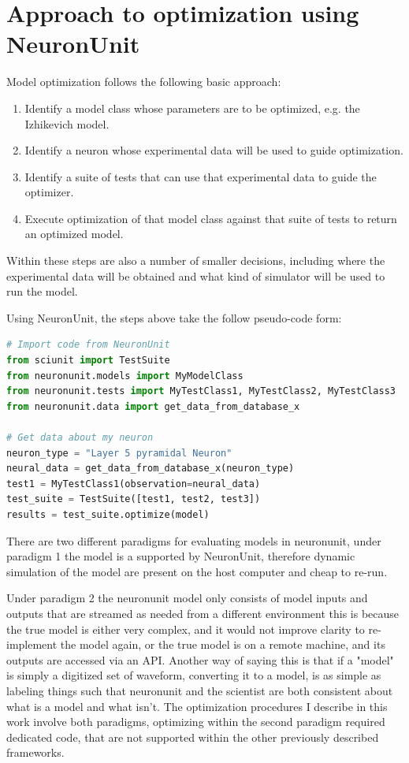 \section{Approach to optimization using NeuronUnit}
Model optimization follows the following basic approach:
\begin{enumerate}
	\item Identify a model class whose parameters are to be optimized, e.g. the Izhikevich model.
	\item Identify a neuron whose experimental data will be used to guide optimization.
	\item Identify a suite of tests that can use that experimental data to guide the optimizer.
	\item Execute optimization of that model class against that suite of tests to return an optimized model.
\end{enumerate}
Within these steps are also a number of smaller decisions, including where the experimental data will be obtained and what kind of simulator will be used to run the model.

Using NeuronUnit, the steps above take the follow pseudo-code form:

\begin{lstlisting}[language=python]
# Import code from NeuronUnit
from sciunit import TestSuite
from neuronunit.models import MyModelClass
from neuronunit.tests import MyTestClass1, MyTestClass2, MyTestClass3
from neuronunit.data import get_data_from_database_x

# Get data about my neuron
neuron_type = "Layer 5 pyramidal Neuron"
neural_data = get_data_from_database_x(neuron_type)
test1 = MyTestClass1(observation=neural_data)
test_suite = TestSuite([test1, test2, test3])
results = test_suite.optimize(model)
\end{lstlisting}

There are two different paradigms for evaluating models in neuronunit, under paradigm 1 the model is a supported by NeuronUnit, therefore dynamic simulation of the model are present on the host computer and cheap to re-run.

Under paradigm 2 the neuronunit model only consists of model inputs and outputs that are streamed as needed from a different environment this is because the true model is either very complex, and it would not improve clarity to re-implement the model again, or the true model is on a remote machine, and its outputs are accessed via an API. Another way of saying this is that if a "model" is simply a digitized set of waveform, converting it to a model, is as simple as labeling things such that neuronunit and the scientist are both consistent about what is a model and what isn't. The optimization procedures I describe in this work involve both paradigms, optimizing within the second paradigm required dedicated code, that are not supported within the other previously described frameworks.

